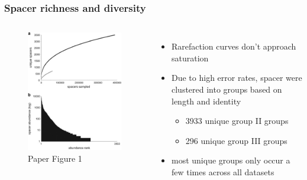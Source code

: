 \documentclass[10pt]{beamer}
\begin{document}
\begin{frame}[fragile]
	\frametitle{Spacer richness and diversity}
    \begin{columns}
    	\begin{figure}
    		\includegraphics[width=\textwidth,height=0.6\textheight,keepaspectratio]{ismej_fig1.jpg}
    		\caption{Paper Figure 1}
    	\end{figure}
		\begin{itemize}
			\item Rarefaction curves don't approach saturation
            \item Due to high error rates, spacer were clustered into groups based on length and identity
            	\begin{itemize}
                	\item 3933 unique group II groups
                    \item 296 unique group III groups
                \end{itemize}
            \item most unique groups only occur a few times across all datasets
		\end{itemize}
	\end{columns}
\end{frame}
\end{document}
